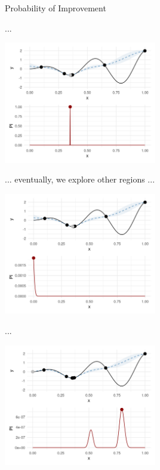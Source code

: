 \documentclass[11pt,compress,t,notes=noshow, xcolor=table]{beamer}
\begin{document}
\begin{vbframe}{Probability of Improvement}
\framebreak

...

\begin{center}
  \includegraphics[width = 0.5\textwidth]{figure_man/bayesian_loop_pi_7.png}
\end{center}

\framebreak

... eventually, we explore other regions ...

\begin{center}
  \includegraphics[width = 0.5\textwidth]{figure_man/bayesian_loop_pi_8.png}
\end{center}

\framebreak

...

\begin{center}
  \includegraphics[width = 0.5\textwidth]{figure_man/bayesian_loop_pi_9.png}
\end{center}

\end{vbframe}
\end{document}
